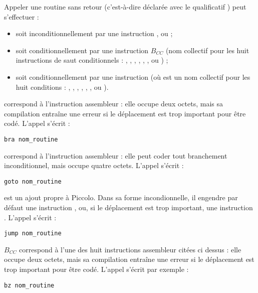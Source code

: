 
Appeler une routine sans retour (c'est-à-dire déclarée avec le qualificatif ) peut s'effectuer :
\begin{itemize}
  \item soit inconditionnellement par une instruction  ,  ou  ;
  \item soit conditionnellement par une instruction $B_{CC}$ (nom collectif pour les huit instructions de saut conditionnels : , , , , , ,  ou ) ;
  \item soit conditionnellement par une instruction  (où  est un nom collectif pour les huit conditions : , , , , , ,  ou ).
\end{itemize}



 correspond à l’instruction assembleur  : elle occupe deux octets, mais sa compilation entraîne une erreur si le déplacement est trop important pour être codé. L'appel s'écrit :
\begin{lstlisting}[language=piccolo]
bra nom_routine
\end{lstlisting}



 correspond à l’instruction assembleur  : elle peut coder tout branchement inconditionnel, mais occupe quatre octets. L'appel s'écrit :
\begin{lstlisting}[language=piccolo]
goto nom_routine
\end{lstlisting}


 est un ajout propre à Piccolo. Dans sa forme incondionnelle, il engendre par défaut une instruction , ou, si le déplacement est trop important, une instruction . L'appel s'écrit :
\begin{lstlisting}[language=piccolo]
jump nom_routine
\end{lstlisting}

$B_{CC}$ correspond à l’une des huit instructions assembleur citées ci dessus : elle occupe deux octets, mais sa compilation entraîne une erreur si le déplacement est trop important pour être codé. L'appel s'écrit par exemple :
\begin{lstlisting}[language=piccolo]
bz nom_routine
\end{lstlisting}



